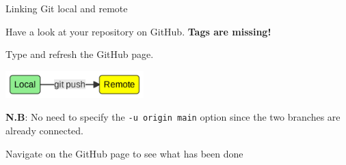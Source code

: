 \documentclass[10pt]{beamer}
\begin{document}
\begin{frame}[fragile]{Linking Git local and remote}

Have a look at your repository on GitHub. \textbf{Tags are missing!}

Type  and refresh the GitHub page.
 
\begin{center}
    \includegraphics[width=0.4\textwidth]{mermaid/mermaid-figure-14.png}
\end{center}

\textbf{N.B}: No need to specify the \verb+-u origin main+ option since the two branches are already connected.

Navigate on the GitHub page to see what has been done

\end{frame}
\end{document}
